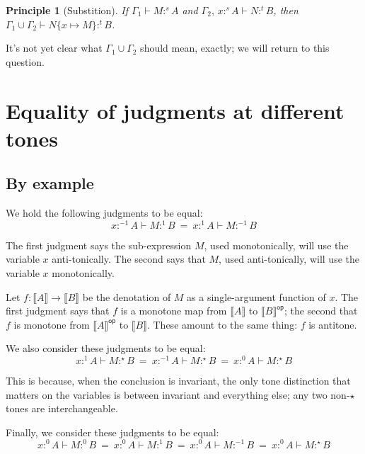 \documentclass{article}
\newtheorem{principle}{Principle}
\newcommand{\ms}[1]{\ensuremath{\mathsf{#1}}}
\newcommand{\GG}{\Gamma}
\newcommand{\sub}[1]{\{{#1}\}}
\newcommand{\den}[1]{\llbracket{#1}\rrbracket}
\newcommand{\tm}{1}             %
\newcommand{\ta}{-1}            %
\newcommand{\ti}{{\star}}       %
\newcommand{\tb}{0}             %
\newcommand{\h}[3]{#1 :^{#3}\! {#2}}
\newcommand{\hm}[2]{\h{#1}{#2}{\tm}}
\newcommand{\ha}[2]{\h{#1}{#2}{\ta}}
\newcommand{\hi}[2]{\h{#1}{#2}{\ti}}
\newcommand{\hb}[2]{\h{#1}{#2}{\tb}}
\begin{document}
\begin{principle}[Substition]
  If $\GG_1 \vdash \h{M}{A}{s}$ and $\GG_2,\, \h{x}{A}{s} \vdash \h{N}{B}{t}$,
  then \(\GG_1 \cup \GG_2 \vdash \h{N\sub{x \mapsto M}}{B}{t}\).
\end{principle}

It's not yet clear what $\GG_1 \cup \GG_2$ should mean, exactly; we will return to
this question.


\section{Equality of judgments at different tones}

\subsection{By example}

We hold the following judgments to be equal:
\begin{equation}\label{eqn:ex1}
 \ha{x}{A} \vdash \hm{M}{B} ~=~ \hm{x}{A} \vdash \ha{M}{B}
\end{equation}

The first judgment says the sub-expression $M$, used monotonically, will use the
variable $x$ anti-tonically. The second says that $M$, used anti-tonically, will
use the variable $x$ monotonically.

Let $f : \den{A} \to \den{B}$ be the denotation of $M$ as a single-argument
function of $x$. The first judgment says that $f$ is a monotone map from
$\den{A}$ to $\den{B}^{\ms{op}}$; the second that $f$ is monotone from
$\den{A}^{\ms{op}}$ to $\den{B}$. These amount to the same thing: $f$ is
antitone.

We also consider these judgments to be equal:
\begin{equation}
  \hm{x}{A} \vdash \hi{M}{B}
  ~=~
  \ha{x}{A} \vdash \hi{M}{B}
  ~=~
  \hb{x}{A} \vdash \hi{M}{B}
\end{equation}

This is because, when the conclusion is invariant, the only tone distinction
that matters on the variables is between invariant and everything else; any two
non-$\ti$ tones are interchangeable.

Finally, we consider these judgments to be equal:
\begin{equation} \label{eqn:ex3}
  \hb{x}{A} \vdash \hb{M}{B}
  ~=~
  \hb{x}{A} \vdash \hm{M}{B}
  ~=~
  \hb{x}{A} \vdash \ha{M}{B}
  ~=~
  \hb{x}{A} \vdash \hi{M}{B}
\end{equation}
\end{document}
